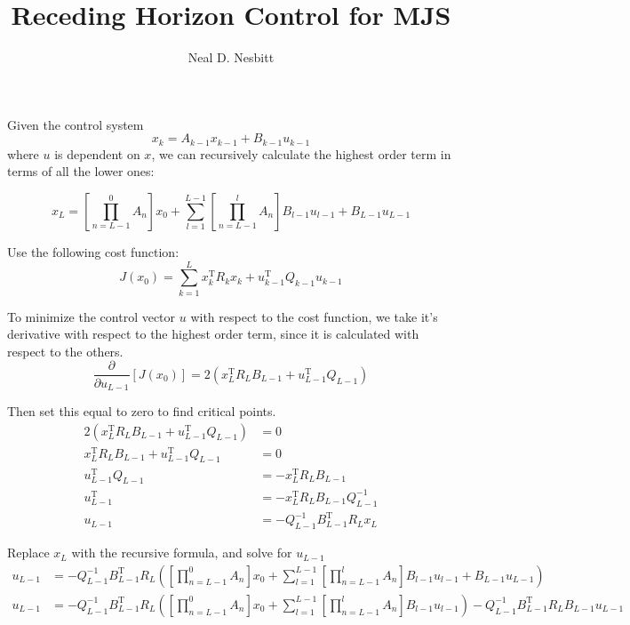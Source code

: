 \documentclass{article}
\title{Receding Horizon Control for MJS}
\author{Neal D. Nesbitt}
\begin{document}
\maketitle

\theoremstyle{definition}
\newtheorem{definition}{Definition}[section]
\newtheorem{lemma}{Lemma}[section]


Given the control system
\[ x_{k} = A_{k-1}x_{k-1} + B_{k-1}u_{k-1} \]
where $u$ is dependent on $x$, we can recursively calculate the highest order term in terms of all the lower ones:

\[ x_{L} = \left[ \prod_{n = L-1}^{0} A_{n} \right]x_{0} + \sum_{l = 1}^{L-1} \left[ \prod_{n = L-1}^{l} A_{n} \right]B_{l-1}u_{l-1} + B_{L-1}u_{L-1} \]

Use the following cost function:
\[ J(x_{0}) = \sum_{k = 1}^{L} x_{k}^{\text{T}}R_{k}x_{k} + u_{k-1}^{\text{T}}Q_{k-1}u_{k-1} \]

To minimize the control vector $u$ with respect to the cost function, we take it's derivative with respect to the highest order term, since it is calculated with respect to the others.
\[ \frac{\partial}{\partial u_{L-1}} \left[ J(x_{0}) \right] = 2 \left( x_{L}^{\text{T}}R_{L}B_{L-1} + u_{L-1}^{\text{T}}Q_{L-1} \right) \]

Then set this equal to zero to find critical points.
\begin{align*}
2 \left( x_{L}^{\text{T}}R_{L}B_{L-1} + u_{L-1}^{\text{T}}Q_{L-1} \right) &= 0 \\
x_{L}^{\text{T}}R_{L}B_{L-1} + u_{L-1}^{\text{T}}Q_{L-1} &= 0 \\
u_{L-1}^{\text{T}}Q_{L-1} &= -x_{L}^{\text{T}}R_{L}B_{L-1} \\
u_{L-1}^{\text{T}} &= -x_{L}^{\text{T}}R_{L}B_{L-1}Q_{L-1}^{-1} \\
u_{L-1} &= -Q_{L-1}^{-1} B_{L-1}^{\text{T}} R_{L} x_{L}
\end{align*}

Replace $x_{L}$ with the recursive formula, and solve for $u_{L-1}$
\begin{align*}
u_{L-1} &= -Q_{L-1}^{-1} B_{L-1}^{\text{T}} R_{L} \left( \left[ \prod_{n = L-1}^{0} A_{n} \right]x_{0} + \sum_{l = 1}^{L-1} \left[ \prod_{n = L-1}^{l} A_{n} \right]B_{l-1}u_{l-1} + B_{L-1}u_{L-1} \right) \\
u_{L-1} &= -Q_{L-1}^{-1} B_{L-1}^{\text{T}} R_{L} \left( \left[ \prod_{n = L-1}^{0} A_{n} \right]x_{0} + \sum_{l = 1}^{L-1} \left[ \prod_{n = L-1}^{l} A_{n} \right]B_{l-1}u_{l-1} \right) - Q_{L-1}^{-1} B_{L-1}^{\text{T}} R_{L}B_{L-1}u_{L-1}
\end{align*}
\end{document}
